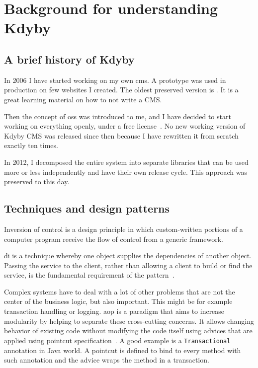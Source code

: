 \chapter{Background for understanding Kdyby}

\section{A brief history of Kdyby} \label{sec:theory:kdyby-history}

In 2006 I have started working on my own \gls{cms}. A prototype was used in production on few websites I created. The oldest preserved version is . It is a great learning material on how to not write a CMS.

Then the concept of \gls{oss} was introduced to me, and I have decided to start working on everything openly, under a free license~\cite{fsf:free-software}. No new working version of Kdyby CMS was released since then because I have rewritten it from scratch exactly ten times.

In 2012, I decomposed the entire system into separate libraries that can be used more or less independently and have their own release cycle. This approach was preserved to this day.

\section{Techniques and design patterns}

 \label{sec:theory:di}

Inversion of control is a design principle in which custom-written portions of a computer program receive the flow of control from a generic framework.

\Gls{di} is a technique whereby one object supplies the dependencies of another object. Passing the service to the client, rather than allowing a client to build or find the service, is the fundamental requirement of the pattern~\cite{fowler:di}.

 \label{sec:theory:aop}

Complex systems have to deal with a lot of other problems that are not the center of the business logic, but also important. This might be for example transaction handling or logging. \gls{aop} is a paradigm that aims to increase modularity by helping to separate these cross-cutting concerns. It allows changing behavior of existing code without modifying the code itself using advices that are applied using pointcut specification~\cite{kiczales1997aspect}. A good example is a \lstinline{Transactional} annotation in Java world. A pointcut is defined to bind to every method with such annotation and the advice wraps the method in a transaction.

